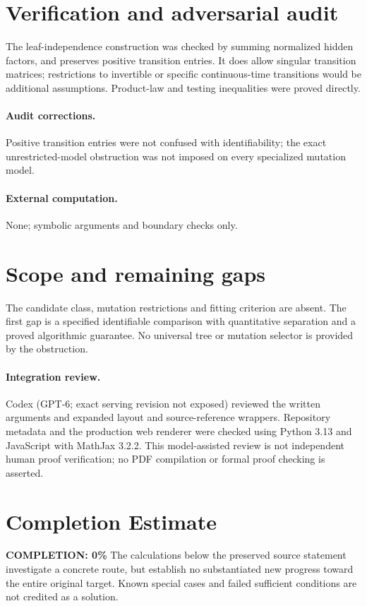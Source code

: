 \documentclass[11pt]{article}
\begin{document}
\section{Verification and adversarial audit}
The leaf-independence construction was checked by summing normalized
hidden factors, and preserves positive transition entries. It does allow
singular transition matrices; restrictions to invertible or specific
continuous-time transitions would be additional assumptions. Product-law and
testing inequalities were proved directly.
\paragraph{Audit corrections.} Positive transition entries were not confused with identifiability; the exact unrestricted-model obstruction was not imposed on every specialized mutation model.
\paragraph{External computation.} None; symbolic arguments and boundary checks only.
\section{Scope and remaining gaps}
The candidate class, mutation restrictions and fitting criterion are absent.
The first gap is a specified identifiable comparison with quantitative separation
and a proved algorithmic guarantee. No universal tree or mutation selector is
provided by the obstruction.
\paragraph{Integration review.} Codex (GPT-6; exact serving revision not exposed) reviewed the written arguments and expanded layout and source-reference wrappers. Repository metadata and the production web renderer were checked using Python 3.13 and JavaScript with MathJax 3.2.2. This model-assisted review is not independent human proof verification; no PDF compilation or formal proof checking is asserted.

\section{Completion Estimate}
\noindent\textbf{COMPLETION: 0\%}
The calculations below the preserved source statement investigate a concrete route,
but establish no substantiated new progress toward the entire original target.
Known special cases and failed sufficient conditions are not credited as a solution.
\end{document}
